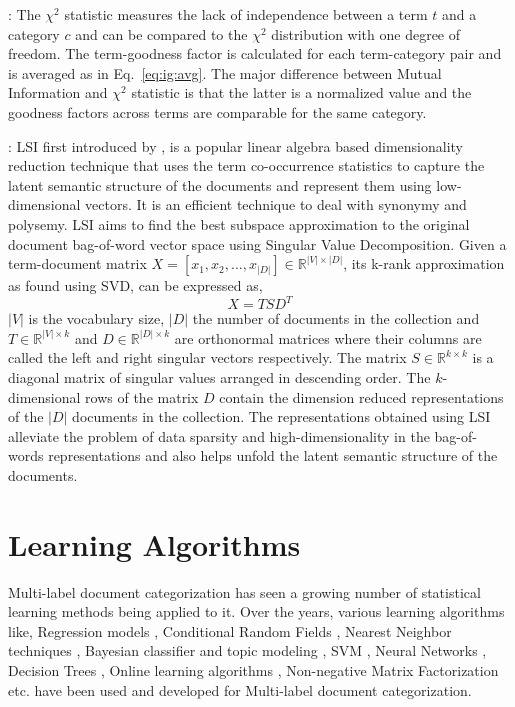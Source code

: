  : The $\chi^{2}$ statistic measures the lack of independence between a term $t$ and a category $c$ and can be compared to the $\chi^{2}$ distribution with one degree of freedom. The term-goodness factor is calculated for each term-category pair and is averaged as in Eq.~\ref{eq:ig:avg}. The major difference between Mutual Information and $\chi^{2}$ statistic is that the latter is a normalized value and the goodness factors across terms are comparable for the same category.

 : LSI first introduced by \citet{deerwester1990indexing}, is a popular linear algebra based dimensionality reduction technique that uses the term co-occurrence statistics to capture the latent semantic structure of the documents and represent them using low-dimensional vectors. It is an efficient technique to deal with synonymy and polysemy. LSI aims to find the best subspace approximation to the original document bag-of-word vector space using Singular Value Decomposition. Given a term-document matrix $X = \left[ x_{1}, x_{2}, \ldots, x_{|D|} \right] \in \mathbb{R}^{|V| \times |D|}$, its k-rank approximation as found using SVD, can be expressed as, 
\begin{equation}
X = T S D^{T}
\end{equation}
$|V|$ is the vocabulary size, $|D|$ the number of documents 
in the collection and $T \in \mathbb{R}^{|V| \times k}$ and $D \in \mathbb{R}^{|D| \times k}$ are orthonormal matrices where their columns are called the left and right singular vectors respectively. The matrix $S \in \mathbb{R}^{k \times k}$ is a diagonal matrix of singular values arranged in descending order. The $k$-dimensional rows of the matrix $D$ contain the dimension reduced representations of the $|D|$ documents in the collection. The representations obtained using LSI alleviate the problem of data sparsity and high-dimensionality in the bag-of-words representations and also helps unfold the latent semantic structure of the documents.

\section{Learning Algorithms}
\label{sec:lalgos}
Multi-label document categorization has seen a growing number of 
statistical learning methods being applied to it. Over the years, 
various learning algorithms like, Regression models 
\citep{cooper1994full, fuhr1991air}, Conditional Random Fields 
\citep{ghamrawi2005collective}, Nearest Neighbor techniques \citep{
yang1994expert, zhang2005k, zhang2007ml}, Bayesian classifier and topic modeling \citep{lewis1994comparison, mccallum1999multi, nigam2000text, rubin2012statistical, nigam1999using, ueda2002parametric}, 
SVM \citep{joachims1998text, elisseeff2001kernel}, Neural Networks \citep{wiener1995neural, ng1997feature}, Decision Trees \citep{tong1994machine}, Online learning algorithms \citep{lewis1996training, crammer2002new}, Non-negative Matrix 
Factorization \citep{liu2006semi} etc. have been used and developed 
for Multi-label document categorization.

